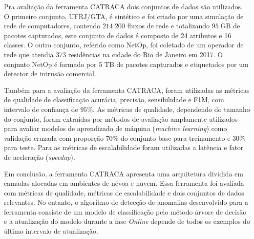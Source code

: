 Pra avaliação da ferramenta CATRACA dois conjuntos de dados são utilizados.
O primeiro conjunto, UFRJ/GTA, é sintético e foi criado por uma simulação de
rede de computadores, contendo $214\;200$ fluxos de rede e totalizando $95\;
\mathrm{GB}$ de pacotes capturados, este conjunto de dados
é composto de 24 atributos e 16 classes.
O outro conjunto, referido como NetOp, foi coletado de um operador de rede que
atendia 373 residências na cidade do Rio de Janeiro em 2017.
O conjunto NetOp é formado por 5 TB de pacotes capturados e etiquetados por um
detector de intrusão comercial.

Também para a avaliação da ferramenta CATRACA, foram utilizadas as métricas de qualidade
de classificação acurácia, precisão, sensibilidade e F1M, com intervalo de
confiança de $95\%$.
As métricas de qualidade, dependendo do tamanho do conjunto, foram extraídas por
métodos de avaliação amplamente utilizados para avaliar modelos de aprendizado
de máquina (\emph{machine learning}) como validação cruzada com proporção
$70\%$ do conjunto base para treinamento e $30\%$ para teste.
Para as métricas de escalabilidade foram utilizadas a latência e fator de aceleração
(\emph{speedup}).

Em conclusão, a ferramenta CATRACA apresenta uma arquitetura dividida em camadas
alocadas em ambientes de névoa e nuvem.
Essa ferramenta foi avaliada com métricas de qualidade, métricas de
escalabilidade e dois conjuntos de dados relevantes.
No entanto, o algoritmo de detecção de anomalias desenvolvido para a ferramenta
consiste de um modelo de classificação pelo método árvore de decisão e
a atualização do modelo durante a fase \emph{Online} depende de todos os exemplos do
último intervalo de atualização.


